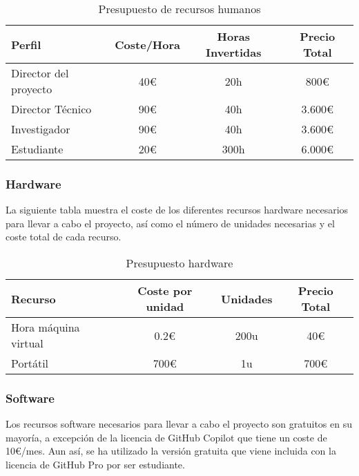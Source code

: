 \begin{table}[ht]
    \centering
    \begin{tabular}[ht]{l|c|c|c}
        \textbf{Perfil}       & \textbf{Coste/Hora} & \textbf{Horas Invertidas} & \textbf{Precio Total} \\
        \hline
        Director del proyecto & 40\euro             & 20h                       & 800\euro              \\
        Director Técnico      & 90\euro             & 40h                       & 3.600\euro            \\
        Investigador          & 90\euro             & 40h                       & 3.600\euro            \\
        Estudiante            & 20\euro             & 300h                      & 6.000\euro            \\
    \end{tabular}
    \caption{Presupuesto de recursos humanos}\label{tab:huma-resources}
\end{table}

\subsubsection{Hardware}
La siguiente tabla muestra el coste de los diferentes recursos hardware
necesarios para llevar a cabo el proyecto, así como el número de unidades
necesarias y el coste total de cada recurso.

\begin{table}[ht]
    \centering
    \begin{tabular}[ht]{l|c|c|c}
        \textbf{Recurso}     & \textbf{Coste por unidad} & \textbf{Unidades} & \textbf{Precio Total} \\
        \hline
        Hora máquina virtual & 0.2\euro                  & 200u              & 40\euro               \\
        Portátil             & 700\euro                  & 1u                & 700\euro              \\
    \end{tabular}
    \caption{Presupuesto hardware}
    \label{tab:hardware-budget}
\end{table}

\subsubsection{Software}
Los recursos software necesarios para llevar a cabo el proyecto son gratuitos
en su mayoría, a excepción de la licencia de GitHub Copilot que tiene un coste
de 10\euro/mes. Aun así, se ha utilizado la versión gratuita que viene incluida
con la licencia de GitHub Pro por ser estudiante.

